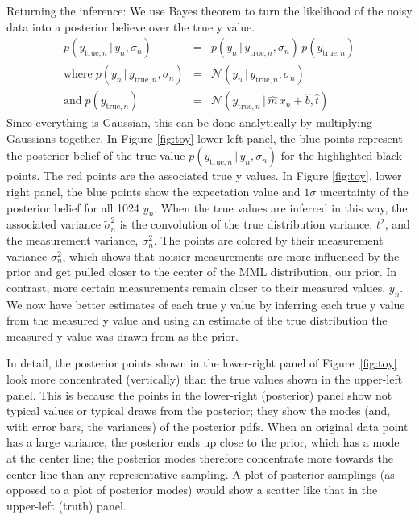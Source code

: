 \documentclass[modern]{aastex61}
\newcommand{\given}{\,|\,}
\newcommand{\true}{\mathrm{true}}
\begin{document}
Returning the inference:
We use Bayes theorem to turn the likelihood of the noisy data into a posterior believe over the true y value.
\begin{eqnarray}
p(y_{\true,n} \given y_n, \tilde{\sigma}_n) &=& p(y_n \given y_{\true,n}, \sigma_n)\,p(y_{\true,n}) \\
\mathrm{where}\;p(y_n \given y_{\true,n}, \sigma_n) &=& \mathcal{N}(y_n \given y_{\true,n}, \sigma_n) \\
\mathrm{and}\;p(y_{\true,n}) &=& \mathcal{N}(y_{\true,n} \given \hat{m}\, x_n + \hat{b}, \hat{t})
\label{eq:toyBayes}
\end{eqnarray}
Since everything is Gaussian, this can be done analytically by multiplying Gaussians together. In Figure \ref{fig:toy} lower left panel, the blue points represent the posterior belief of the true value $p(y_{\true,n} \given y_n, \tilde{\sigma}_n)$ for the highlighted black points. The red points are the associated true y values.
In Figure \ref{fig:toy}, lower right panel, the blue points show the expectation value and $1\sigma$ uncertainty of the posterior belief for all 1024 $y_n$.
When the true values are inferred in this way, the associated variance $\tilde{\sigma}_n^2$ is the convolution of the true distribution variance, $t^2$, and the measurement variance, $\sigma_n^2$.
The points are colored by their measurement variance $\sigma_n^2$, which shows that noisier measurements are more influenced by the prior and get pulled closer to the center of the MML distribution, our prior. In contrast, more certain measurements remain closer to their measured values, $y_n$. We now have better estimates of each true y value by inferring each true y value from the measured y value and using an estimate of the true distribution the measured y value was drawn from as the prior.

In detail, the posterior points shown in the lower-right panel of
Figure~\ref{fig:toy} look more concentrated (vertically) than the true
values shown in the upper-left panel.
This is because the points in the lower-right (posterior) panel show
not typical values or typical draws from the posterior; they show the
modes (and, with error bars, the variances) of the posterior pdfs.
When an original data point has a large variance, the posterior ends
up close to the prior, which has a mode at the center line; the
posterior modes therefore concentrate more towards the center line
than any representative sampling.
A plot of posterior samplings (as opposed to a plot of posterior modes) would
show a scatter like that in the upper-left (truth) panel.
\end{document}
